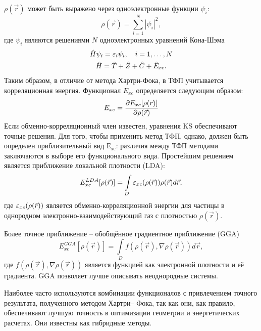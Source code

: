 \( \rho(\vec{r}) \)  может быть выражено через одноэлектронные функции \( \psi_i \):
\begin{equation}
    \rho(\vec{r}) = \sum_{i=1}^N |\psi_i|^2,
\end{equation}
где \(\psi_i\) являются решениями \( N \) одноэлектронных уравнений Кона-Шэма
\begin{gather}
    \hat{H}\psi_i = \varepsilon_i\psi_i,\quad i=1,\ldots,N\\
    \hat{H} = \hat{T} + \hat{Z} + \hat{C} + \hat{E}_{xc}.
\end{gather}
Таким образом, в отличие от метода Хартри-Фока, в ТФП учитывается корреляционная энергия. Функционал \(E_{xc}\) определяется следующим образом:
\begin{equation}
    E_{xc} = \frac{\partial E_{xc}[\rho(\vec{r})]}{\partial \rho(\vec{r})}
\end{equation}
Если обменно-корреляционный член известен, уравнения KS обеспечивают точные решения. Для того, чтобы применить метод ТФП, однако, должен быть определен приблизительный вид \(Е_{хс}\): различия между ТФП методами заключаются в выборе его функционального вида. Простейшим решением является приближение локальной плотности (LDA):
\begin{equation}
    E_{xc}^{LDA}[\rho(\vec{r})] = \int\limits_{D}\varepsilon_{xc}(\rho(\vec{r}))\rho(\vec{r}) d\vec{r},
\end{equation}
где \(\varepsilon_{xc}(\rho(\vec{r}))\) является обменно-корреляционной энергии для частицы в однородном электронно-взаимодействующий газ с плотностью \(\rho(\vec{r})\).

Более точное приближение -- обобщённое градиентное приближение (GGA)
\begin{equation}
    E_{xc}^{GGA}[\rho(\vec{r})] = \int\limits_{D}f(\rho(\vec{r}), \nabla\rho(\vec{r})) d\vec{r},
\end{equation}
где \( f(\rho(\vec{r}), \nabla\rho(\vec{r})) \) является функцией как электронной плотности и её градиента. GGA позволяет лучше описывать неоднородные системы.

Наиболее часто используются комбинации функционалов с привлечением точного результата, полученного методом Хартри-- Фока, так как они, как правило, обеспечивают лучшую точность в оптимизации геометрии и энергетических расчетах. Они известны как гибридные методы.